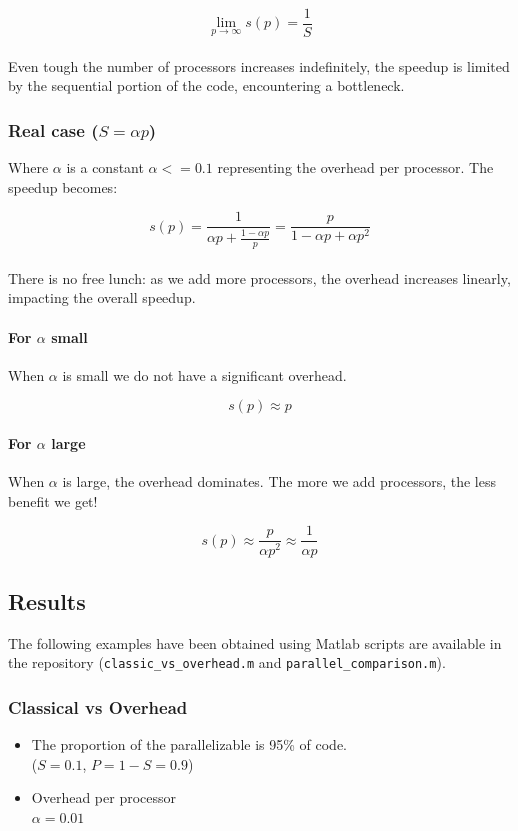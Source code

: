 \[
\lim_{p \to \infty} s(p) = \frac{1}{S}
\]
\\
Even tough the number of processors increases indefinitely, the speedup is limited by the sequential portion of the code, encountering a bottleneck.

\subsubsection*{Real case ($S=\alpha p$)}
Where $\alpha$ is a constant $\alpha <= 0.1$ representing the overhead per processor. The speedup becomes:

\[
s(p) = \frac{1}{\alpha p + \frac{1 - \alpha p}{p}} = \frac{p}{1 - \alpha p + \alpha p^2}
\]
\\
There is no free lunch: as we add more processors, the overhead increases linearly, impacting the overall speedup.

\paragraph{For $\alpha$ small}
When $\alpha$ is small we do not have a significant overhead.

\[
s(p) \approx p
\]

\paragraph{For $\alpha$ large}
When $\alpha$ is large, the overhead dominates. The more we add processors, the less benefit we get!

\[
s(p) \approx \frac{p}{\alpha p^2} \approx \frac{1}{\alpha p}
\]


\subsection{Results}
The following examples have been obtained using Matlab scripts are available in the repository (\texttt{classic\_vs\_overhead.m} and \texttt{parallel\_comparison.m}).

\subsubsection*{Classical vs Overhead}
\begin{itemize}
    \item The proportion of the parallelizable is 95\% of code.\\
    ($S=0.1$, $P = 1-S = 0.9$)
    \item Overhead per processor\\
    $\alpha = 0.01$
\end{itemize}

